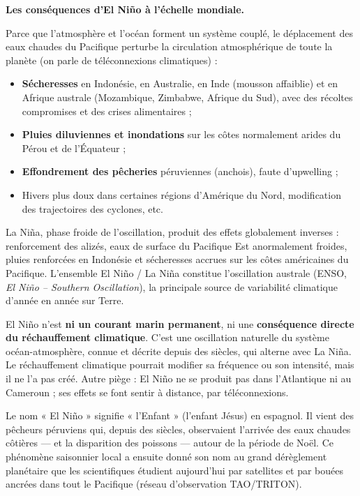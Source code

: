 \documentclass[11pt]{article}
\newcommand{\cle}[1]{{\popxbold\color{popdark}#1}}
\begin{document}
\textbf{Les conséquences d'El Niño à l'échelle mondiale.}\par
Parce que l'atmosphère et l'océan forment un système couplé, le déplacement des eaux chaudes du Pacifique perturbe la circulation atmosphérique de toute la planète (on parle de \cle{téléconnexions climatiques}) :

\begin{itemize}
\item \textbf{Sécheresses} en Indonésie, en Australie, en Inde (mousson affaiblie) et en \cle{Afrique australe} (Mozambique, Zimbabwe, Afrique du Sud), avec des récoltes compromises et des crises alimentaires ;
\item \textbf{Pluies diluviennes et inondations} sur les côtes normalement arides du \cle{Pérou} et de l'Équateur ;
\item \textbf{Effondrement des pêcheries} péruviennes (anchois), faute d'upwelling ;
\item Hivers plus doux dans certaines régions d'Amérique du Nord, modification des trajectoires des cyclones, etc.
\end{itemize}

\cle{La Niña}, phase froide de l'oscillation, produit des effets globalement inverses : renforcement des alizés, eaux de surface du Pacifique Est anormalement froides, pluies renforcées en Indonésie et sécheresses accrues sur les côtes américaines du Pacifique. L'ensemble El Niño / La Niña constitue l'oscillation australe (ENSO, \emph{El Niño -- Southern Oscillation}), la principale source de variabilité climatique d'année en année sur Terre.

\begin{attention}
El Niño n'est \textbf{ni un courant marin permanent}, ni une \textbf{conséquence directe du réchauffement climatique}. C'est une \cle{oscillation naturelle} du système océan-atmosphère, connue et décrite depuis des siècles, qui alterne avec La Niña. Le réchauffement climatique pourrait modifier sa fréquence ou son intensité, mais il ne l'a pas créé. Autre piège : El Niño ne se produit pas dans l'Atlantique ni au Cameroun ; ses effets se font sentir à distance, par téléconnexions.
\end{attention}

\begin{savaistu}
Le nom « El Niño » signifie « l'Enfant » (l'enfant Jésus) en espagnol. Il vient des \cle{pêcheurs péruviens} qui, depuis des siècles, observaient l'arrivée des eaux chaudes côtières — et la disparition des poissons — autour de la période de \cle{Noël}. Ce phénomène saisonnier local a ensuite donné son nom au grand dérèglement planétaire que les scientifiques étudient aujourd'hui par satellites et par bouées ancrées dans tout le Pacifique (réseau d'observation TAO/TRITON).
\end{savaistu}
\end{document}
